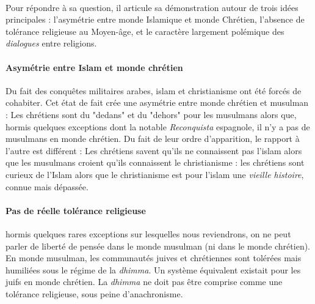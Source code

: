 \paragraph{}
Pour répondre à sa question, il articule sa démonstration autour de trois idées principales : l'asymétrie entre monde Islamique et monde Chrétien, l'absence de tolérance religieuse au Moyen-âge, et le caractère largement polémique des \textit{dialogues} entre religions.



\paragraph{Asymétrie entre Islam et monde chrétien} Du fait des conquêtes militaires arabes, islam et christianisme ont été forcés de cohabiter. Cet état de fait crée une asymétrie entre monde chrétien et musulman : Les chrétiens sont du "dedans" et du "dehors" pour les musulmans alors que, hormis quelques exceptions dont la notable \textit{Reconquista} espagnole, il n'y a pas de musulmans en monde chrétien. Du fait de leur ordre d'apparition, le rapport à l'autre est différent : Les chrétiens savent qu'ils ne connaissent pas l'islam alors que les musulmans croient qu'ils connaissent le christianisme : les chrétiens sont curieux de l'Islam alors que le christianisme est pour l'islam une \textit{vieille histoire}, connue mais dépassée. 


\paragraph{Pas de réelle tolérance religieuse} hormis quelques rares exceptions sur lesquelles nous reviendrons, on ne peut parler de liberté de pensée dans le monde musulman (ni dans le monde chrétien). En monde musulman, les communautés juives et chrétiennes sont tolérées mais humiliées sous le régime de la \textit{dhimma}. Un système équivalent existait pour les juifs en monde chrétien.  La \textit{dhimma} ne doit pas être comprise comme une tolérance religieuse, sous peine d'anachronisme. 

